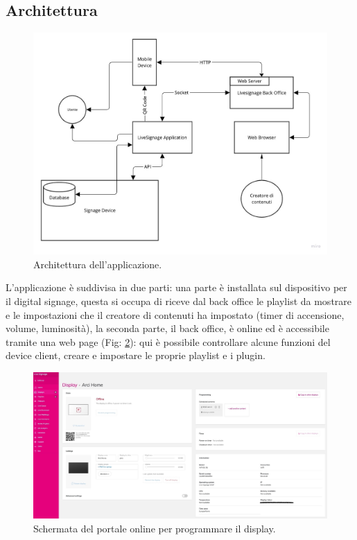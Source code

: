 \subsection{Architettura}
\begin{figure}[H]
    \centering
    \includegraphics[width= 1.1\textwidth]{images/Introduzione/Architettura.jpg} 
    \caption{Architettura dell'applicazione.} 
    \label{fig:architettura}
\end{figure}

L'applicazione è suddivisa in due parti: una parte è installata sul dispositivo per il digital signage, questa si occupa di riceve dal back office le playlist da mostrare e le impostazioni che il creatore di contenuti ha impostato (timer di accensione, volume, luminosità), la seconda parte, il back office, è online ed è accessibile tramite una web page (Fig: \ref*{fig:schermata-web}): qui è possibile controllare alcune funzioni del device client, creare e impostare le proprie playlist e i plugin. 

\begin{figure}[H]
    \centering
    \includegraphics[width= 1.1\textwidth]{images/Introduzione/SchermataWebLS.jpg} 
    \caption{Schermata del portale online per programmare il display.} 
    \label{fig:schermata-web}
\end{figure}

